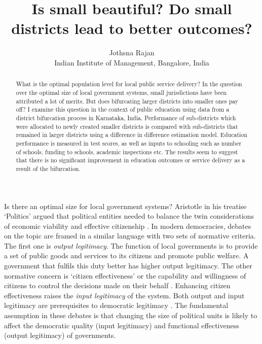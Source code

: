 \documentclass[12pt, a4paper]{article}
\title{Is small beautiful? Do small districts lead to better outcomes?}
\author{Jothsna Rajan \\
	\small{Indian Institute of Management, Bangalore, India}}
\begin{document}
	\maketitle
	\begin{abstract}
		What is the optimal population level for local public service delivery? In the question over the optimal size of local government systems, small jurisdictions have been attributed a lot of merits. But does bifurcating larger districts into smaller ones pay off? I examine this question in the context of public education using data from a district bifurcation process in Karnataka, India. Performance of sub-districts which were allocated to newly created smaller districts is compared with sub-districts that remained in larger districts using a difference in difference estimation model. Education performance is measured in test scores, as well as inputs to schooling such as number of schools, funding to schools, academic inspections etc. The results seem to suggest that there is no significant improvement in education outcomes or service delivery as a result of the bifurcation. 
	\end{abstract}
\paragraph{} Is there an optimal size for local government systems? Aristotle in his treatise `Politics' argued that political entities needed to balance the twin considerations of economic viability and effective citizenship \parencite{aristotle_politics_1984}. In modern democracies, debates on the topic are framed in a similar language with two sets of normative criteria. The first one is \textit{output legitimacy}. The function of local governments is to provide a set of public goods and services to its citizens and promote public welfare. A government that fulfils this duty better has higher output legitimacy. The other normative concern is `citizen effectiveness' or the capability and willingness of citizens to control the decisions made on their behalf \parencite{dahl_size_1973}. Enhancing citizen effectiveness raises the \textit{input legitimacy} of the system. Both output and input legitimacy are prerequisites to democratic legitimacy \parencite{scharpf_governing_1999}. The fundamental assumption in these debates is that changing the size of political units is likely to affect the democratic quality (input legitimacy) and functional effectiveness (output legitimacy) of governments. 
\end{document}
